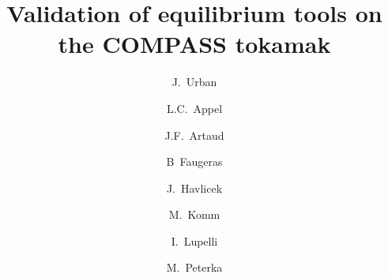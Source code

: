 \documentclass[preprint,5p,times]{elsarticle}
\begin{document}
\begin{frontmatter}



\title{Validation of equilibrium tools on the COMPASS tokamak}

 \author[label1]{J.~Urban}
 \author[label2]{L.C.~Appel}
 \author[label3]{J.F.~Artaud} 
 \author[label4]{B~Faugeras} 
 \author[label1,label5]{J.~Havlicek}
 \author[label1]{M.~Komm}
 \author[label2]{I.~Lupelli} 
 \author[label1,label5]{M.~Peterka} 
 \address[label1]{Institute of Plasma Physics AS CR, v.v.i., Za~Slovankou 3, 182 00 Praha 8, Czech Republic}
 \address[label2]{CCFE}
 \address[label3]{CEA}
 \address[label4]{UNice}
 \address[label5]{Department of Surface and Plasma Science, Faculty of Mathematics and Physics, Charles University in Prague, V Hole\v{s}ovi\v{c}k\'ach 2, 180~00 Praha 8, Czech Republic}


\end{frontmatter}
\end{document}
